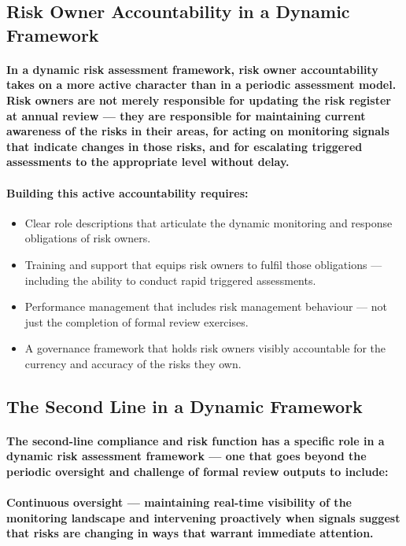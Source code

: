 \subsection{Risk Owner Accountability in a Dynamic Framework}
\paragraph{In a dynamic risk assessment framework, risk owner accountability takes on a more active character than in a periodic assessment model. Risk owners are not merely responsible for updating the risk register at annual review — they are responsible for maintaining current awareness of the risks in their areas, for acting on monitoring signals that indicate changes in those risks, and for escalating triggered assessments to the appropriate level without delay.}
\paragraph{Building this active accountability requires:}
\begin{itemize}
  \item{Clear role descriptions that articulate the dynamic monitoring and response obligations of risk owners.}
  \item{Training and support that equips risk owners to fulfil those obligations — including the ability to conduct rapid triggered assessments.}
  \item{Performance management that includes risk management behaviour — not just the completion of formal review exercises.}
  \item{A governance framework that holds risk owners visibly accountable for the currency and accuracy of the risks they own.}
\end{itemize}

\subsection{The Second Line in a Dynamic Framework}
\paragraph{The second-line compliance and risk function has a specific role in a dynamic risk assessment framework — one that goes beyond the periodic oversight and challenge of formal review outputs to include:}
\paragraph{\textbf{Continuous oversight} — maintaining real-time visibility of the monitoring landscape and intervening proactively when signals suggest that risks are changing in ways that warrant immediate attention.}

